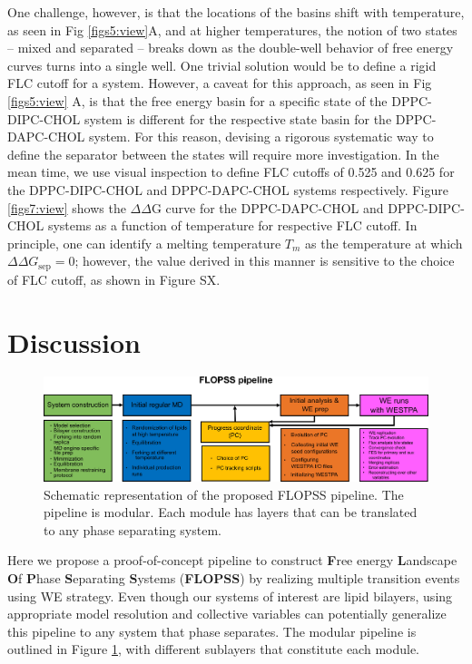 \documentclass{biophys-new}
\begin{document}
One challenge, however, is that the locations of the basins shift with temperature, as seen in Fig \ref{figs5:view}A, and
at higher temperatures, the notion of two states -- mixed and separated -- breaks down as the double-well behavior of free energy curves turns into a single well. 
One trivial solution would be to define a rigid FLC cutoff for a system.
However, a caveat for this approach, as seen in Fig \ref{figs5:view} A, is that the free energy basin for a specific state of the DPPC-DIPC-CHOL system is different for the respective state basin for the DPPC-DAPC-CHOL system.
For this reason, devising a rigorous systematic way to define the separator between the states will require more investigation. In the mean time, we use visual inspection to define FLC cutoffs of 0.525 and 0.625 for the DPPC-DIPC-CHOL and DPPC-DAPC-CHOL systems respectively.
Figure \ref{figs7:view} shows the $\Delta\Delta$G curve for the DPPC-DAPC-CHOL and DPPC-DIPC-CHOL systems as a function of temperature for respective FLC cutoff. In principle, one can identify a melting temperature $T_m$ as the temperature at which $\Delta\Delta G_{\text{sep}}=0$; however, the value derived
in this manner is sensitive to the choice of FLC cutoff, as shown in Figure SX.


\section*{Discussion}

\begin{figure}[hbt!]
\centering
\includegraphics[width=6.5in]{Figures/Main/8/placeholder.jpg}
\caption{Schematic representation of the proposed FLOPSS pipeline. The pipeline is modular. Each module has layers that can be translated to any phase separating system.}
\label{figs8:view}
\end{figure}

Here we propose a proof-of-concept pipeline to construct \textbf{F}ree energy \textbf{L}andscape \textbf{O}f \textbf{P}hase \textbf{S}eparating \textbf{S}ystems (\textbf{FLOPSS}) by realizing multiple transition events using WE strategy.
Even though our systems of interest are lipid bilayers, using appropriate model resolution and collective variables can potentially generalize this pipeline to any system that phase separates.
The modular pipeline is outlined in Figure \ref{figs8:view}, with different sublayers that constitute each module.
\end{document}
